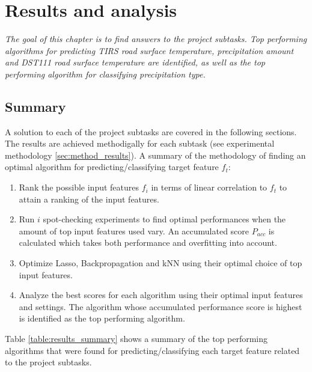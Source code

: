 \chapter{Results and analysis}
\emph{The goal of this chapter is to find answers to the project subtasks. Top performing algorithms for predicting TIRS road surface temperature, precipitation amount and DST111 road surface temperature are identified, as well as the top performing algorithm for classifying precipitation type.}

\section{Summary}
	A solution to each of the project subtasks are covered in the following sections. The results are achieved methodigally for each subtask (see experimental methodology \ref{sec:method_results}). A summary of the methodology of finding an optimal algorithm for predicting/classifying target feature $f_t$:
	\begin{enumerate}
		\item Rank the possible input features $f_i$ in terms of linear correlation to $f_t$ to attain a ranking of the input features.
		\item Run $i$ spot-checking experiments to find optimal performances when the amount of top input features used vary. An accumulated score $P_{acc}$ is calculated which takes both performance and overfitting into account.
		\item Optimize Lasso, Backpropagation and kNN using their optimal choice of top input features.
		\item Analyze the best scores for each algorithm using their optimal input features and settings. The algorithm whose accumulated performance score is highest is identified as the top performing algorithm.
	\end{enumerate}

	Table \ref{table:results_summary} shows a summary of the top performing algorithms that were found for predicting/classifying each target feature related to the project subtasks.
	
